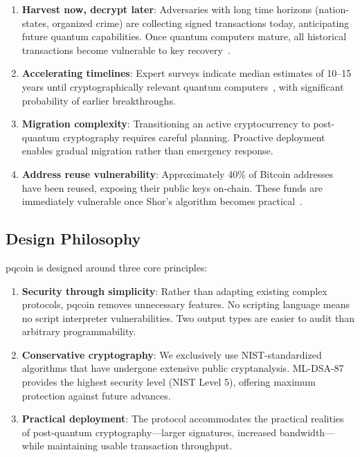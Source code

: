 \documentclass[11pt,a4paper]{article}
\begin{document}
\begin{enumerate}
    \item \textbf{Harvest now, decrypt later}: Adversaries with long time horizons (nation-states, organized crime) are collecting signed transactions today, anticipating future quantum capabilities. Once quantum computers mature, all historical transactions become vulnerable to key recovery~\cite{rand2023}.

    \item \textbf{Accelerating timelines}: Expert surveys indicate median estimates of 10--15 years until cryptographically relevant quantum computers~\cite{mosca2022}, with significant probability of earlier breakthroughs.

    \item \textbf{Migration complexity}: Transitioning an active cryptocurrency to post-quantum cryptography requires careful planning. Proactive deployment enables gradual migration rather than emergency response.

    \item \textbf{Address reuse vulnerability}: Approximately 40\% of Bitcoin addresses have been reused, exposing their public keys on-chain. These funds are immediately vulnerable once Shor's algorithm becomes practical~\cite{stewart2018}.
\end{enumerate}

\subsection{Design Philosophy}

pqcoin is designed around three core principles:

\begin{enumerate}
    \item \textbf{Security through simplicity}: Rather than adapting existing complex protocols, pqcoin removes unnecessary features. No scripting language means no script interpreter vulnerabilities. Two output types are easier to audit than arbitrary programmability.

    \item \textbf{Conservative cryptography}: We exclusively use NIST-standardized algorithms that have undergone extensive public cryptanalysis. ML-DSA-87 provides the highest security level (NIST Level 5), offering maximum protection against future advances.

    \item \textbf{Practical deployment}: The protocol accommodates the practical realities of post-quantum cryptography---larger signatures, increased bandwidth---while maintaining usable transaction throughput.
\end{enumerate}
\end{document}
